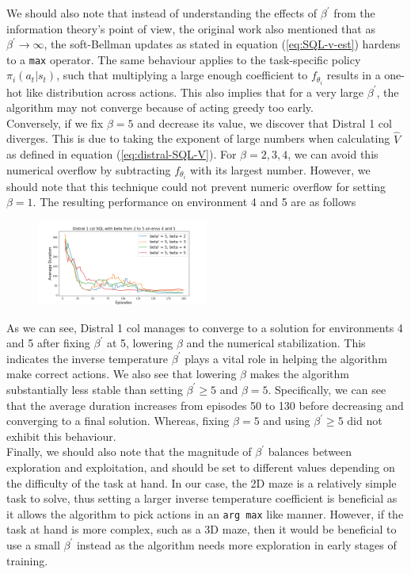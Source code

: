 \documentclass[12pt]{report}
\begin{document}
We should also note that instead of understanding the effects of $\beta^\prime$ from the information theory's point of view, the original work \cite{teh2017distral} also mentioned that as $\beta^\prime \rightarrow \infty$, the soft-Bellman updates as stated in equation (\ref{eq:SQL-v-est}) hardens to a \texttt{max} operator. The same behaviour applies to the task-specific policy $\pi_i(a_t|s_t)$, such that multiplying a large enough coefficient to $f_{\theta_i}$ results in a one-hot like distribution across actions. This also implies that for a very large $\beta^\prime$, the algorithm may not converge because of acting greedy too early.\\

Conversely, if we fix $\beta = 5$ and decrease its value, we discover that Distral 1 col diverges. This is due to taking the exponent of large numbers when calculating $\hat{V}$ as defined in equation (\ref{eq:distral-SQL-V}). For $\beta = 2,3,4$, we can avoid this numerical overflow by subtracting $f_{\theta_i}$ with its largest number. However, we should note that this technique could not prevent numeric overflow for setting $\beta = 1$. The resulting performance on environment 4 and 5 are as follows
\begin{figure}[H]
\centering
\includegraphics[width=0.5\textwidth]{figs/betas/d1_SQL_2_to_5_b_avg_dur.png}
\end{figure}
As we can see, Distral 1 col manages to converge to a solution for environments 4 and 5 after fixing $\beta^\prime$ at 5, lowering $\beta$ and the numerical stabilization. This indicates the inverse temperature $\beta^\prime$ plays a vital role in helping the algorithm make correct actions. We also see that lowering $\beta$ makes the algorithm substantially less stable than setting $\beta^\prime \ge 5$ and $\beta = 5$. Specifically, we can see that the average duration increases from episodes 50 to 130 before decreasing and converging to a final solution. Whereas, fixing $\beta = 5$ and using $\beta^\prime \ge 5$ did not exhibit this behaviour.\\

Finally, we should also note that the magnitude of $\beta^\prime$ balances between exploration and exploitation, and should be set to different values depending on the difficulty of the task at hand. In our case, the 2D maze is a relatively simple task to solve, thus setting a larger inverse temperature coefficient is beneficial as it allows the algorithm to pick actions in an \texttt{arg max} like manner. However, if the task at hand is more complex, such as a 3D maze, then it would be beneficial to use a small $\beta^\prime$ instead as the algorithm needs more exploration in early stages of training.
\end{document}
